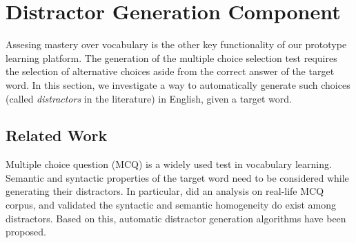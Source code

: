 \section{Distractor Generation Component}
\label{sec:distractor}

Assesing mastery over vocabulary is the other key functionality of our
prototype learning platform.  The generation of the multiple choice
selection test requires the selection of alternative choices aside
from the correct answer of the target word.  In this section, we
investigate a way to automatically generate such choices (called {\it
  distractors} in the literature) in English, given a target word.

\subsection{Related Work}


Multiple choice question (MCQ) is a widely used test in vocabulary learning.
Semantic and syntactic properties of the target word need to be considered while
generating their distractors.  In particular, \cite{pho2014multiple} 
did an analysis on real-life MCQ corpus, and validated the
syntactic and semantic homogeneity do exist among distractors.
Based on this, automatic distractor generation algorithms have been proposed.

